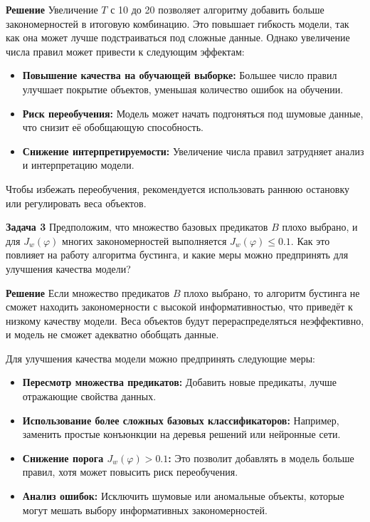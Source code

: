 \textbf{Решение}
Увеличение \( T \) с 10 до 20 позволяет алгоритму добавить больше закономерностей в итоговую комбинацию. Это повышает гибкость модели, так как она может лучше подстраиваться под сложные данные. Однако увеличение числа правил может привести к следующим эффектам:
\begin{itemize}
    \item \textbf{Повышение качества на обучающей выборке:} Большее число правил улучшает покрытие объектов, уменьшая количество ошибок на обучении.
    \item \textbf{Риск переобучения:} Модель может начать подгоняться под шумовые данные, что снизит её обобщающую способность.
    \item \textbf{Снижение интерпретируемости:} Увеличение числа правил затрудняет анализ и интерпретацию модели.
\end{itemize}

Чтобы избежать переобучения, рекомендуется использовать раннюю остановку или регулировать веса объектов.  

\vspace{0.5cm}

\textbf{Задача 3}
Предположим, что множество базовых предикатов \( B \) плохо выбрано, и для \( J_w(\varphi) \) многих закономерностей выполняется \( J_w(\varphi) \leq 0.1 \). Как это повлияет на работу алгоритма бустинга, и какие меры можно предпринять для улучшения качества модели?  

\textbf{Решение}
Если множество предикатов \( B \) плохо выбрано, то алгоритм бустинга не сможет находить закономерности с высокой информативностью, что приведёт к низкому качеству модели. Веса объектов будут перераспределяться неэффективно, и модель не сможет адекватно обобщать данные.  

Для улучшения качества модели можно предпринять следующие меры:
\begin{itemize}
    \item \textbf{Пересмотр множества предикатов:} Добавить новые предикаты, лучше отражающие свойства данных.
    \item \textbf{Использование более сложных базовых классификаторов:} Например, заменить простые конъюнкции на деревья решений или нейронные сети.
    \item \textbf{Снижение порога \( J_w(\varphi) > 0.1 \):} Это позволит добавлять в модель больше правил, хотя может повысить риск переобучения.
    \item \textbf{Анализ ошибок:} Исключить шумовые или аномальные объекты, которые могут мешать выбору информативных закономерностей.
\end{itemize}


